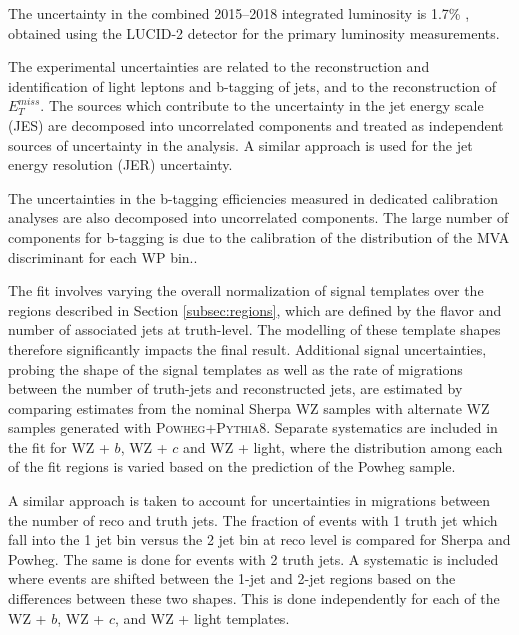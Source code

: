 
The uncertainty in the combined 2015--2018 integrated luminosity is 1.7\% \cite{ATLAS:2019pzw}, obtained using the LUCID-2 detector \cite{LUCID2} for the primary luminosity measurements.

The experimental uncertainties are related to the reconstruction and identification of light leptons and b-tagging of jets, and to the reconstruction of $E^{miss}_T$. The sources which contribute to the uncertainty in the jet energy scale (JES) \cite{jes} are decomposed into uncorrelated components and treated as independent sources of uncertainty in the analysis. A similar approach is used for the jet energy resolution (JER) uncertainty.

The uncertainties in the b-tagging efficiencies measured in dedicated calibration analyses \cite{btag_cal} are also decomposed into uncorrelated components. The large number of components for b-tagging is due to the calibration of the distribution of the MVA discriminant for each WP bin..  

The fit involves varying the overall normalization of signal templates over the regions described in Section \ref{subsec:regions}, which are defined by the flavor and number of associated jets at truth-level. The modelling of these template shapes therefore significantly impacts the final result. Additional signal uncertainties, probing the shape of the signal templates as well as the rate of migrations between the number of truth-jets and reconstructed jets, are estimated by comparing estimates from the nominal Sherpa WZ samples with alternate WZ samples generated with \textsc{Powheg}+\textsc{Pythia8}. Separate systematics are included in the fit for WZ + $b$, WZ + $c$ and WZ + light, where the distribution among each of the fit regions is varied based on the prediction of the Powheg sample.

A similar approach is taken to account for uncertainties in migrations between the number of reco and truth jets. The fraction of events with 1 truth jet which fall into the 1 jet bin versus the 2 jet bin at reco level is compared for Sherpa and Powheg. The same is done for events with 2 truth jets. A systematic is included where events are shifted between the 1-jet and 2-jet regions based on the differences between these two shapes. This is done independently for each of the WZ + $b$, WZ + $c$, and WZ + light templates.

